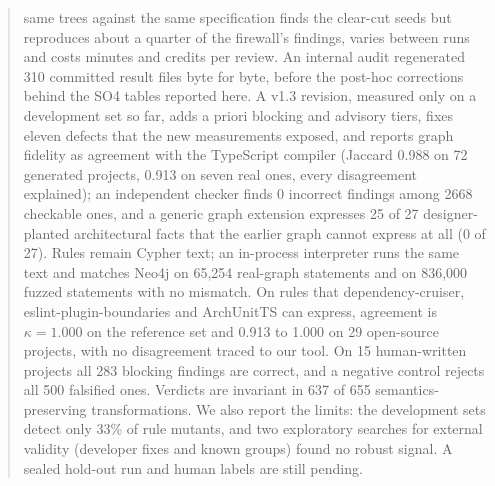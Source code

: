 \documentclass[10pt,a4paper]{article}
\begin{document}
\begin{abstract}
same trees against the same specification finds the clear-cut seeds but reproduces about a quarter of the
firewall's findings, varies between runs and costs minutes and credits per review. An internal audit regenerated
310 committed result files byte for byte, before the post-hoc corrections behind the SO4 tables reported here.
A v1.3 revision, measured only on a development set so far, adds a priori blocking and advisory tiers, fixes eleven
defects that the new measurements exposed, and reports graph fidelity as agreement with the TypeScript compiler
(Jaccard 0.988 on 72 generated projects, 0.913 on seven real ones, every disagreement explained); an independent
checker finds 0 incorrect findings among 2668 checkable ones, and a generic graph extension expresses 25 of 27
designer-planted architectural facts that the earlier graph cannot express at all (0 of 27). Rules remain Cypher
text; an in-process interpreter runs the same text and matches Neo4j on 65,254 real-graph statements and on 836,000
fuzzed statements with no mismatch. On rules that dependency-cruiser, eslint-plugin-boundaries and ArchUnitTS can
express, agreement is $\kappa = 1.000$ on the reference set and 0.913 to 1.000 on 29 open-source projects, with no
disagreement traced to our tool. On 15 human-written projects all 283 blocking findings are correct, and a negative
control rejects all 500 falsified ones. Verdicts are invariant in 637 of 655 semantics-preserving transformations.
We also report the limits: the development sets detect only 33\% of rule mutants, and two exploratory searches for
external validity (developer fixes and known groups) found no robust signal. A sealed hold-out run and human labels
are still pending.

\end{abstract}
\end{document}
